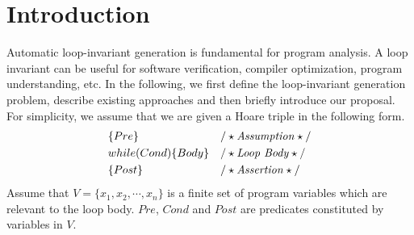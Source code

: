
\section{Introduction} %
\label{sec:introduction}

Automatic loop-invariant generation is fundamental for program analysis. A loop invariant can be useful for software verification, compiler optimization, program understanding, etc. In the following, we first define the loop-invariant generation problem, describe existing approaches and then briefly introduce our proposal. For simplicity, we assume that we are given a Hoare triple in the following form.
\begin{align*}
&\{Pre\} & & /\star\text{\emph{Assumption}}\star/ \\
& while (Cond) \{ Body \} && /\star\text{\emph{Loop Body}}\star/\\
&\{ Post \} & & /\star\text{\emph{Assertion}}\star/
\end{align*}
Assume that $V = \{x_1{,} x_2{,} \cdots{,} x_n\}$ is a finite set of program variables which are relevant to the loop body. $Pre$, $Cond$ and $Post$ are predicates constituted by variables in $V$.

